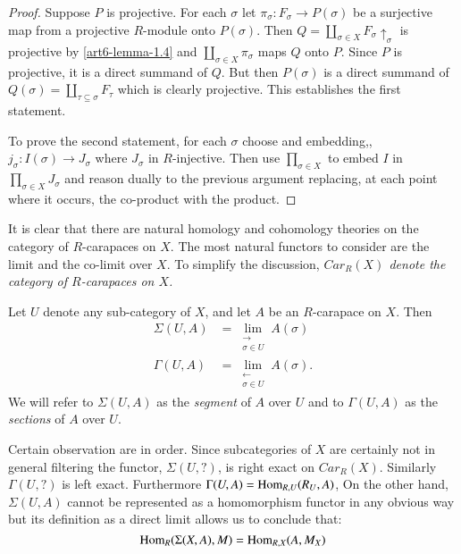 \begin{proof}
Suppose $P$ is projective. For each $\sigma$ let $\pi_{\sigma}: F_{\sigma}\rightarrow P(\sigma)$ be a surjective map from a projective $R$-module onto  $P(\sigma)$. Then $Q= \coprod_{\sigma \in X}F_{\sigma} \uparrow_{\sigma}$ is projective by \ref{art6-lemma-1.4} and $\coprod_{\sigma \in X}\pi_{\sigma}$ maps $Q$ onto $P$. Since $P$ is projective, it is a direct summand of $Q$. But then $P(\sigma)$ is a  direct summand of $Q(\sigma) = \coprod_{\tau \subseteq \sigma}F_{\tau}$ which is clearly projective. This establishes the first statement.

To prove the second statement, for each $\sigma$ choose and embedding,, $j_{\sigma} : I(\sigma) \rightarrow J_{\sigma}$ where $J_{\sigma}$ in $R$-injective. Then use $\prod_{\sigma\in X}$ to embed $I$ in $\prod_{\sigma \in X}J_{\sigma}$ and reason dually to the previous argument replacing, at each point where it occurs, the co-product with the product. 
\end{proof}

It is clear that there are natural homology and cohomology theories on the category of $R$-carapaces on $X$. The most natural functors to consider are the limit and the co-limit over $X$. To simplify the discussion, \textit{$C ar_{R}(X)$ denote the category of $R$-carapaces on $X$.}

\begin{definition}
Let $U$ denote any sub-category of $X$, and let $A$ be an $R$-carapace on $X$. Then
\begin{align*}
\Sigma (U, A) &= \lim\limits_{\substack{\longrightarrow \\ \sigma \in U}}A(\sigma)\\
\Gamma (U, A) &= \lim\limits_{\substack{\longleftarrow \\ \sigma \in U}}A(\sigma).
\end{align*}
We will refer to $\Sigma(U, A)$ as the \textit{segment} of $A$ over $U$ and to $\Gamma(U, A)$ as the \textit{sections} of $A$ over $U$.
\end{definition}

Certain observation are in order. Since subcategories of $X$ are certainly not in general filtering the functor, $\Sigma(U, ?)$, is right exact on $C ar_{R}(X)$. Similarly $\Gamma(U, ?)$ is left exact. Furthermore $\Gamma(U, A) = \operatorname{Hom}_{R, U}(R_{U}, A)$, On the other hand, $\Sigma(U, A)$ cannot be represented as a homomorphism functor in any obvious way but its definition as a direct limit allows us to conclude that:
$$
\operatorname{Hom}_{R}(\Sigma(X, A), M) = \operatorname{Hom}_{R, X}(A, M_{X})
$$ 

